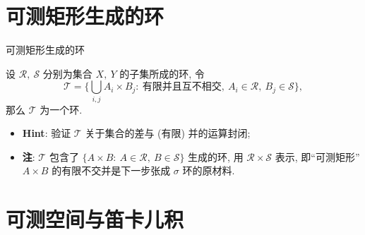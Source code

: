 \section[乘积环]{可测矩形生成的环}


\begin{frame}{可测矩形生成的环}

\begin{thm}
设 $\mathscr{R},\ \mathscr{S}$ 分别为集合 $X,\ Y$ 的子集所成的环, 令
\[
\mathscr{T} = \Big\{ \bigcup_{i,j} A_i \times B_j:\ \text{有限并且互不相交},\
A_i \in \mathscr{R},\ B_j \in \mathscr{S} \Big\} ,
\]
那么 $\mathscr{T}$ 为一个环.
\end{thm}

\pause

\begin{itemize}
\item \textbf{Hint}: 验证 $\mathscr{T}$ 关于集合的\alert{差}与 (有限) \alert{并}的运算封闭;
\item \textbf{注}: $\mathscr{T}$ 包含了 $\{ A \times B:\ A \in \mathscr{R},\ B \in \mathscr{S} \}$
  生成的环, 用 $\mathscr{R} \times \mathscr{S}$ 表示,
  即``可测矩形''$A \times B$ 的有限不交并是下一步张成 $\sigma$ 环的原材料.
\end{itemize}

\end{frame}


\section[可测空间]{可测空间与笛卡儿积}


